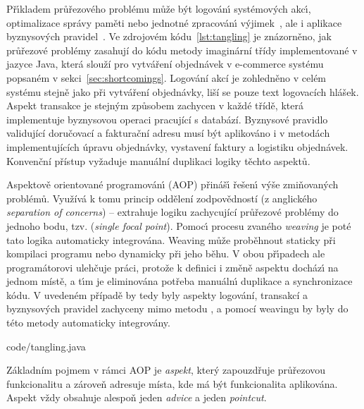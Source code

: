 Př\'{\i}kladem průřezového problému může b\'yt logován\'{\i}
systémov\'ych akc\'{\i}, optimalizace správy paměti
nebo jednotné zpracován\'{\i} v\'yjimek~\cite{kiczales1997aspect},
ale i aplikace byznysových pravidel~\cite{cemus2014aspect}.
Ve zdrojovém kódu~\ref{lst:tangling} je znázorněno, jak průřezové
problémy zasahují do kódu metody imaginární třídy implementované v
jazyce Java, která slouží pro vytváření objednávek v e-commerce
systému popsaném v sekci~\ref{sec:shortcomings}.
Logování akcí je zohledněno v celém systému  stejně jako při vytváření
objednávky, liší se pouze text logovacích hlášek. Aspekt transakce je stejným
způsobem zachycen v každé třídě, která implementuje byznysovou operaci
pracující s databází. Byznysové pravidlo validující doručovací a fakturační
adresu musí být aplikováno i v metodách implementujících úpravu objednávky,
vystavení faktury a logistiku objednávek. Konvenční přístup vyžaduje
manuální duplikaci logiky těchto aspektů.

Aspektově orientované programován\'{\i} (\gls{AOP}) přináš\'{\i} řešen\'{\i}
v\'yše zmiňovaných problémů. Využívá k tomu princip oddělení zodpovědností (z anglického \textit{separation
of concerns}) -- extrahuje logiku zachycující průřezové problémy do jednoho bodu, tzv. (\textit{single focal point}).
Pomoc\'{\i} procesu zvaného \textit{weaving} je poté tato logika automaticky integrována.
Weaving může proběhnout staticky při kompilaci programu nebo dynamicky
při jeho běhu. V obou př\'{\i}padech ale programátorovi ulehčuje práci,
protože k definici i změně aspektu docház\'{\i} na jednom místě, a t\'{\i}m je eliminována
potřeba manuáln\'{\i} duplikace a synchronizace kódu. V uvedeném případě by tedy byly aspekty
logování, transakcí a byznysových pravidel zachyceny mimo metodu ,
a pomocí weavingu by byly do této metody automaticky integrovány.


{code/tangling.java}

Základním pojmem v rámci \gls{AOP} je \textit{aspekt},
který zapouzdřuje průřezovou funkcionalitu a zároveň adresuje místa, kde má být
funkcionalita aplikována. Aspekt vždy obsahuje alespoň jeden \textit{advice}
a jeden \textit{pointcut}.

